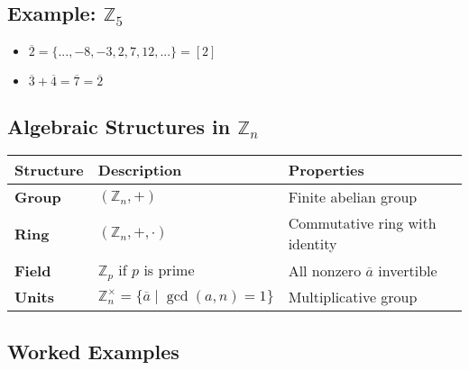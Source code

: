 \documentclass[]{article}
\providecommand{\tightlist}{%
  \setlength{\itemsep}{0pt}\setlength{\parskip}{0pt}}
\begin{document}
\subsection{\texorpdfstring{Example:
\(\mathbb{Z}_5\)}{Example: \textbackslash mathbb\{Z\}\_5}}\label{example-mathbbz_5}

\begin{itemize}
\tightlist
\item
  \(\overline{2} = \{ ..., -8, -3, 2, 7, 12, ... \} = [2]\)
\item
  \(\overline{3} + \overline{4} = \overline{7} = \overline{2}\)
\end{itemize}

\subsection{\texorpdfstring{Algebraic Structures in
\(\mathbb{Z}_n\)}{Algebraic Structures in \textbackslash mathbb\{Z\}\_n}}\label{algebraic-structures-in-mathbbz_n}

\begin{longtable}[]{@{}
  >{\raggedright\arraybackslash}p{}
  >{\raggedright\arraybackslash}p{}
  >{\raggedright\arraybackslash}p{}@{}}
\toprule\noalign{}
\begin{minipage}[b]{\linewidth}\raggedright
Structure
\end{minipage} & \begin{minipage}[b]{\linewidth}\raggedright
Description
\end{minipage} & \begin{minipage}[b]{\linewidth}\raggedright
Properties
\end{minipage} \\
\midrule\noalign{}
\endhead
\bottomrule\noalign{}
\endlastfoot
\textbf{Group} & \((\mathbb{Z}_n, +)\) & Finite abelian group \\
\textbf{Ring} & \((\mathbb{Z}_n, +, \cdot)\) & Commutative ring with
identity \\
\textbf{Field} & \(\mathbb{Z}_p\) if \(p\) is prime & All nonzero
\(\overline{a}\) invertible \\
\textbf{Units} &
\(\mathbb{Z}_n^\times = \{ \overline{a} \mid \gcd(a,n)=1 \}\) &
Multiplicative group \\
\end{longtable}

\subsection{Worked Examples}\label{worked-examples}
\end{document}
